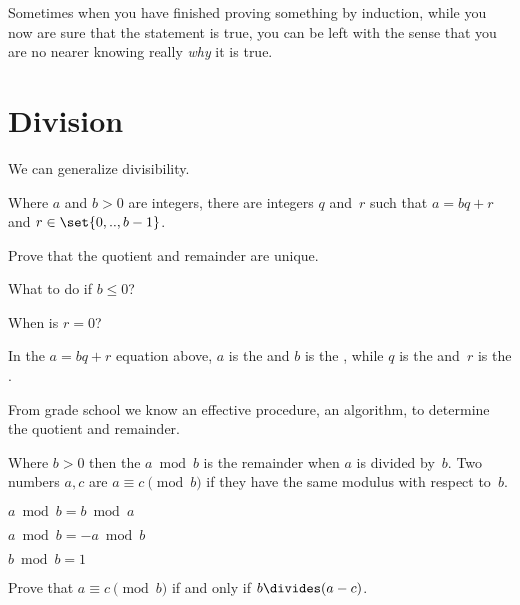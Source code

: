 \documentclass{ibl}
\begin{document}
Sometimes when you have finished proving something by induction, 
while you now are sure that the statement is true, 
you can be left with the sense
that you are no nearer knowing really \emph{why} it is true.



\section{Division}
We can generalize divisibility.

\begin{ex}
\begin{exes}
\item Where $a$ and $b>0$ are integers, there are integers $q$ and~$r$
such
that $a=bq+r$ and
$r\in\set{0,..,b-1}$.
\item
Prove that the quotient and remainder are unique.
\item 
What to do if $b\leq 0$?
\end{exes}
\end{ex}

\begin{ex}
When is $r=0$? 
\end{ex}

\begin{df}
In the $a=bq+r$ equation above, $a$ is the  and
$b$ is the , while 
$q$ is the  and~$r$ is the .  
\end{df}

From grade school we know an effective procedure, an algorithm, to 
determine the quotient and remainder.

\begin{df}
Where $b>0$ then the  $a\bmod b$ 
is the remainder when $a$ is divided by~$b$.
Two numbers $a,c$ are  $a\equiv c\pmod b$ 
if they have the same modulus with respect to~$b$.
\end{df}

\begin{ex}\pord
\begin{exes}
\item $a\bmod b=b\bmod a$
\item $a\bmod b=-a\bmod b$
\item $b\bmod b=1$    
\end{exes}
\end{ex}

\begin{ex}
Prove that $a\equiv c\pmod b$ if and only if $b\divides (a-c)$.  
\end{ex}
\end{document}

